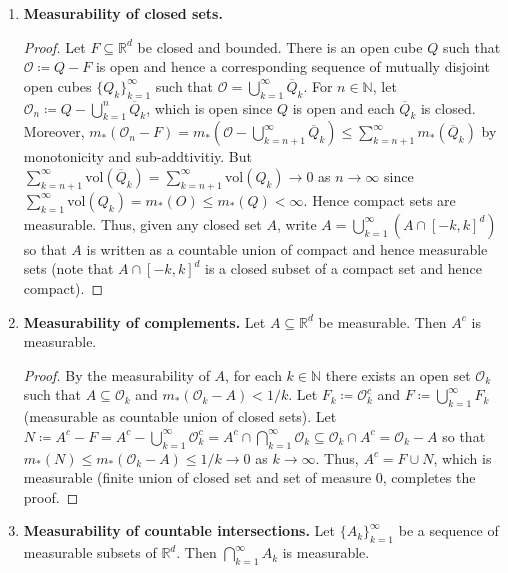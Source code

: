 \begin{enumerate}
\item \textbf{Measurability of closed sets.}
	\begin{proof}\renewcommand{\qedsymbol}{}
		Let \( F \subseteq \mathbb{R}^{d} \) be closed and bounded. There is an open cube \( Q \) such that \( \mathcal{O} \coloneqq Q - F \) is open and hence a corresponding sequence of mutually disjoint open cubes \( \{ Q_k \} _{k=1} ^{\infty} 	 \) such that \( \mathcal{O} = \bigcup_{k=1}^{\infty} \overline{Q}_k \). For \( n \in \mathbb{N}  \), let \( \mathcal{O} _n\coloneqq Q - \bigcup_{k=1}^{n} \overline{Q}_k \), which is open since \( Q \) is open and each \( \overline{Q}_k \) is closed. Moreover, \( m_*(\mathcal{O}_n - F) = m_*(\mathcal{O} - \bigcup_{k=n+1}^{\infty} \overline{Q}_k) \leq \sum_{k=n+1}^{\infty}m_*(\overline{Q}_k)   \) by monotonicity and sub-addtivitiy. But \( \sum_{k=n+1}^{\infty}\mbox{vol}(\overline{Q}_k) = \sum_{k=n+1}^{\infty}\mbox{vol}(Q_k) \to 0  \) as \( n \to \infty \) since \( \sum_{k=1}^{\infty} \mbox{vol}(Q_k) = m_*(O) \leq m_*(Q) < \infty \). Hence compact sets are measurable. Thus, given any closed set \( A \), write \( A = \bigcup_{k=1}^{\infty} (A \cap [-k,k]^{d} ) \) so that \( A \) is written as a countable union of compact and hence measurable sets (note that \( A \cap [-k,k]^{d}  \) is a closed subset of a compact set and hence compact).
	\end{proof}
\item \textbf{Measurability of complements.} Let \( A \subseteq \mathbb{R}^{d}  \) be measurable. Then \( A^{c}  \) is measurable.
	\begin{proof}\renewcommand{\qedsymbol}{}
	By the measurability of \( A \), for each \( k \in \mathbb{N}  \) there exists an open set \( \mathcal{O} _k \) such that \( A \subseteq \mathcal{O} _k \) and \( m_*(\mathcal{O} _k - A) < 1 / k  \). Let \( F_k \coloneqq \mathcal{O} _k^{c}   \) and \( F \coloneqq \bigcup_{k=1}^{\infty} F_k \) (measurable as countable union of closed sets). Let \( N \coloneqq A^{c} - F = A^{c} - \bigcup_{k=1}^{\infty} \mathcal{O} _k^{c}  = A^{c} \cap  \bigcap_{k=1}^{\infty} \mathcal{O}_k \subseteq \mathcal{O}_k \cap A^{c}  =  \mathcal{O} _k - A \) so that \( m_*(N) \leq m_*(\mathcal{O} _k - A) \leq 1 / k \to 0  \) as \( k \to \infty \). Thus, \( A^c = F \cup N  \), which is measurable (finite union of closed set and set of measure 0, completes the proof.
	\end{proof}
\item \textbf{Measurability of countable intersections.} Let \( \{ A_k \} _{k=1} ^{\infty}  \) be a sequence of measurable subsets of \( \mathbb{R}^{d}  \). Then \( \bigcap_{k=1}^{\infty} A_k  \) is measurable.

\end{enumerate}
